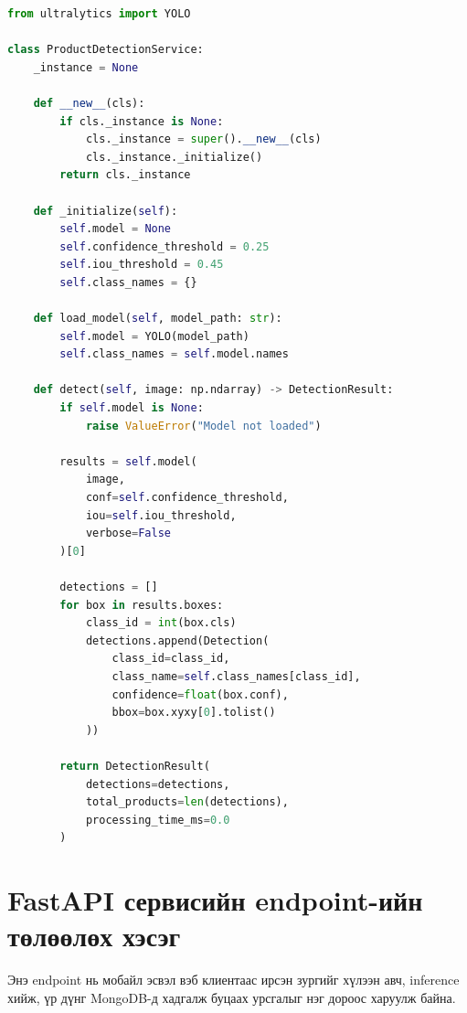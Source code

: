 \begin{lstlisting}[language=Python, caption=ProductDetectionService-ийн гол бүтэц]
from ultralytics import YOLO

class ProductDetectionService:
    _instance = None

    def __new__(cls):
        if cls._instance is None:
            cls._instance = super().__new__(cls)
            cls._instance._initialize()
        return cls._instance

    def _initialize(self):
        self.model = None
        self.confidence_threshold = 0.25
        self.iou_threshold = 0.45
        self.class_names = {}

    def load_model(self, model_path: str):
        self.model = YOLO(model_path)
        self.class_names = self.model.names

    def detect(self, image: np.ndarray) -> DetectionResult:
        if self.model is None:
            raise ValueError("Model not loaded")

        results = self.model(
            image,
            conf=self.confidence_threshold,
            iou=self.iou_threshold,
            verbose=False
        )[0]

        detections = []
        for box in results.boxes:
            class_id = int(box.cls)
            detections.append(Detection(
                class_id=class_id,
                class_name=self.class_names[class_id],
                confidence=float(box.conf),
                bbox=box.xyxy[0].tolist()
            ))

        return DetectionResult(
            detections=detections,
            total_products=len(detections),
            processing_time_ms=0.0
        )
\end{lstlisting}

\section{FastAPI сервисийн endpoint-ийн төлөөлөх хэсэг}

Энэ endpoint нь мобайл эсвэл вэб клиентаас ирсэн зургийг хүлээн авч, inference хийж, үр дүнг MongoDB-д хадгалж буцаах урсгалыг нэг дороос харуулж байна.

